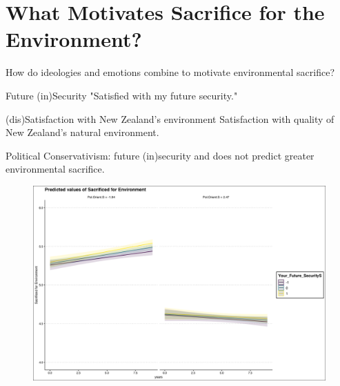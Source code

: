 \documentclass{beamer}
\begin{document}
\section{What Motivates Sacrifice for the Environment?}
\begin{frame}{How do ideologies and emotions combine to motivate environmental sacrifice?}
    

\begin{alertblock}{Future (in)Security}
"Satisfied with my future security."
\end{alertblock}


\begin{alertblock}{(dis)Satisfaction with New Zealand's environment}
Satisfaction with quality of New Zealand’s natural environment.
\end{alertblock}


\end{frame}


\begin{frame}{Political Conservativism: future (in)security and does not predict greater environmental sacrifice.}
\begin{figure}
\includegraphics[width=.8\textwidth,height=\textheight,keepaspectratio]{Figures/X_SACRIFICEMADE_Your_Future_SecurityS_Pol.Orient.S.png}
\end{figure}
\end{frame}
\end{document}
